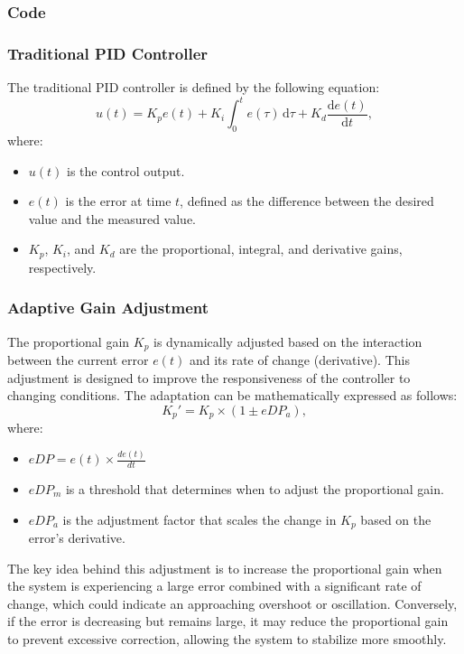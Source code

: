 \documentclass[a4paper,12pt]{./article}
\begin{document}
\subsubsection{Code}

\subsubsection{Traditional PID Controller}
The traditional PID controller is defined by the following equation:
$$
u(t) = K_p e(t) + K_i \int_0^t e(\tau) \,\mathrm{d}\tau + K_d \frac{\mathrm{d}e(t)}{\mathrm{d}t},
$$
where:
\begin{itemize}
\item $u(t)$ is the control output.
\item $e(t)$ is the error at time $t$, defined as the difference between the desired value and the measured value.
\item $K_p$, $K_i$, and $K_d$ are the proportional, integral, and derivative gains, respectively.
\end{itemize}
\subsubsection{Adaptive Gain Adjustment}
The proportional gain $K_p$ is dynamically adjusted based on the interaction between the current error $e(t)$ and its rate of change (derivative). This adjustment is designed to improve the responsiveness of the controller to changing conditions. The adaptation can be mathematically expressed as follows:
$$
K_p' = K_p \times (1 \pm eDP_a),
$$
where:
\begin{itemize}
\item $eDP = e(t) \times \frac{de(t)}{dt}$
\item $eDP_m$ is a threshold that determines when to adjust the proportional gain.
\item $eDP_a$ is the adjustment factor that scales the change in $K_p$ based on the error’s derivative. 
\end{itemize}
The key idea behind this adjustment is to increase the proportional gain when the system is experiencing a large error combined with a significant rate of change, which could indicate an approaching overshoot or oscillation. Conversely, if the error is decreasing but remains large, it may reduce the proportional gain to prevent excessive correction, allowing the system to stabilize more smoothly.
\end{document}
